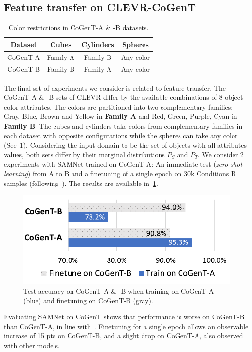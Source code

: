 \subsection{Feature transfer on CLEVR-CoGenT}
\label{sec:feature}
\begin{table}[ht]
	\centering
		\begin{tabular}{cccc}
			\toprule
			Dataset	& Cubes	& Cylinders &	Spheres	\\
			\midrule
			CoGenT A &  Family A  & Family B 	&	Any color  \\
			CoGenT B	&	Family B  &	Family A	&	Any color \\
			\bottomrule
		\end{tabular}
	\caption{Color restrictions in CoGenT-A \& -B datasets.}
	\label{tab:cogent_conditions}
\end{table}

The final set of experiments we consider is related to feature transfer.
The CoGenT-A \& -B sets of CLEVR differ by the available combinations of 8 object color attributes.
The colors are partitioned into two complementary families: 
Gray, Blue, Brown and Yellow in \textbf{Family A} and Red, Green, Purple, Cyan in \textbf{Family B}. 
The cubes and cylinders take colors from complementary families in each dataset with opposite configurations while
the spheres can take any color (See~\cref{tab:cogent_conditions}). 
Considering the input domain to be the set of objects with all attributes values, both sets differ by their marginal distributions $P_S$ and $P_T$. We consider 2 experiments with SAMNet trained on CoGenT-A: An immediate test (\emph{zero-shot learning}) from A to B and a finetuning of a single epoch on 30k Conditions B samples (following~\cite{johnson2017inferring, mascharka2018transparency, perez2018film, marois2018transfer}). The results are available in~\cref{fig:CoGenT-B-results}.

\begin{figure}[!t]
	\centering
	\includegraphics[width=0.8\columnwidth]{img/results/CoGenT_B_results.pdf}
	\caption{Test accuracy on CoGenT-A \& -B when training on CoGenT-A (blue) and finetuning on CoGenT-B (gray).}
	\label{fig:CoGenT-B-results}
\end{figure}
Evaluating SAMNet on CoGenT shows that performance is worse on CoGenT-B than CoGenT-A, in line with~\cite{johnson2017inferring, mascharka2018transparency, perez2018film}. Finetuning for a single epoch allows an observable increase of 15 pts on CoGenT-B, and a slight drop on CoGenT-A, also observed with other models.